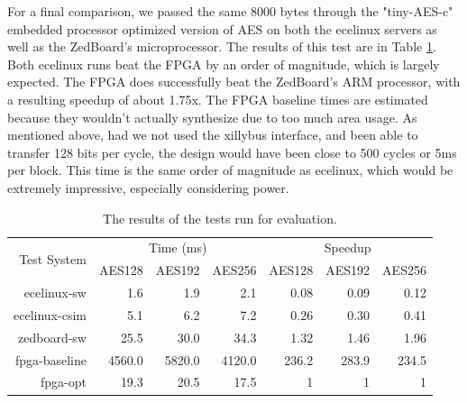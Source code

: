 For a final comparison, we passed the same 8000 bytes through the "tiny-AES-c" embedded processor optimized version of AES on both the ecelinux servers as well as the ZedBoard's microprocessor. The results of this test are in Table \ref{table:aestime}. Both ecelinux runs beat the FPGA by an order of magnitude, which is largely expected. The FPGA does successfully beat the ZedBoard's ARM processor, with a resulting speedup of about 1.75x. The FPGA baseline times are estimated because they wouldn't actually synthesize due to too much area usage.
As mentioned above, had we not used the xillybus interface, and been able to transfer 128 bits per cycle, the design would have been close to 500 cycles or 5ms per block.
This time is the same order of magnitude as ecelinux, which would be extremely impressive, especially considering power.

\begin{table}[h]
\begin{center}
\begin{tabular}{@{}r r r r r r r@{}}
\toprule
\multirow{2}{*}{Test System} & \multicolumn{3}{c}{Time (ms)} & \multicolumn{3}{c}{Speedup} \\ \cline{2-7}
              & AES128 & AES192 & AES256 & AES128 & AES192 & AES256 \\ \midrule
ecelinux-sw   & 1.6         & 1.9         & 2.1         & 0.08             & 0.09             & 0.12             \\
ecelinux-csim & 5.1         & 6.2         & 7.2         & 0.26             & 0.30             & 0.41             \\
zedboard-sw   & 25.5        & 30.0        & 34.3        & 1.32             & 1.46             & 1.96             \\
fpga-baseline & 4560.0      & 5820.0      & 4120.0      & 236.2            & 283.9            & 234.5            \\
fpga-opt      & 19.3        & 20.5        & 17.5        & 1                & 1                & 1                \\ \bottomrule
\end{tabular}
\label{table:aestime}
\caption{The results of the tests run for evaluation.}
\end{center}
\end{table}

